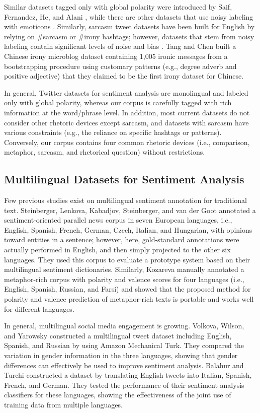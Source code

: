 \documentclass[english]{jnlp_1.4}
\begin{document}
Similar datasets tagged only with global polarity were introduced by Saif, Fernandez, He, and Alani \citeyear{Saif13}, while there are other datasets that use noisy labeling with emoticons \cite{Go09,Pak10}. Similarly, sarcasm tweet datasets have been built for English \cite{Roberto11,Reyes12} by relying on \#sarcasm or \#irony hashtags; however, datasets that stem from noisy labeling contain significant levels of noise and bias \cite{Davidov10,Read05}. Tang and Chen \citeyear{Tang14} built a Chinese irony microblog dataset containing 1,005 ironic messages from a bootstrapping procedure using customary patterns (e.g., degree adverb and positive adjective) that they claimed to be the first irony dataset for Chinese.

In general, Twitter datasets for sentiment analysis are monolingual and labeled only with global polarity, whereas our corpus is carefully tagged with rich information at the word/phrase level. In addition, most current datasets do not consider other rhetoric devices except sarcasm, and datasets with sarcasm have various constraints (e.g., the reliance on specific hashtags or patterns). Conversely, our corpus contains four common rhetoric devices (i.e., comparison, metaphor, sarcasm, and rhetorical question) without restrictions.


\subsection{Multilingual Datasets for Sentiment Analysis}

Few previous studies exist on multilingual sentiment annotation for traditional text. Steinberger, Lenkova, Kabadjov, Steinberger, and van der Goot \citeyear{Steinberger11} annotated a sentiment-oriented parallel news corpus in seven European languages, i.e., English, Spanish, French, German, Czech, Italian, and Hungarian, with opinions toward entities in a sentence; however, here, gold-standard annotations were actually performed in English, and then simply projected to the other six languages. They used this corpus to evaluate a prototype system based on their multilingual sentiment dictionaries. Similarly, Kozareva \citeyear{Kozareva13} manually annotated a metaphor-rich corpus with polarity and valence scores for four languages (i.e., English, Spanish, Russian, and Farsi) and showed that the proposed method for polarity and valence prediction of metaphor-rich texts is portable and works well for different languages.

In general, multilingual social media engagement is growing. Volkova, Wilson, and Yarowsky \citeyear{Volkova13} constructed a multilingual tweet dataset including English, Spanish, and Russian by using Amazon Mechanical Turk. They compared the variation in gender information in the three languages, showing that gender differences can effectively be used to improve sentiment analysis. Balahur and Turchi \citeyear{Balahur13} constructed a dataset by translating English tweets into Italian, Spanish, French, and German. They tested the performance of their sentiment analysis classifiers for these languages, showing the effectiveness of the joint use of training data from multiple languages.
\end{document}
